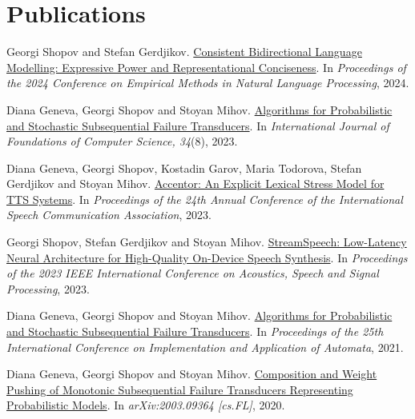 \documentclass[12pt,a4paper,sans,colorlinks]{moderncv}
\begin{document}
\section{Publications}
\begin{cvenumerate}
	\item Georgi Shopov and Stefan Gerdjikov. \newline \href{https://aclanthology.org/2024.emnlp-main.328/}{Consistent Bidirectional Language Modelling: Expressive Power and Representational Conciseness}. \newline In \emph{Proceedings of the 2024 Conference on Empirical Methods in Natural Language Processing}, 2024.
	\item Diana Geneva, Georgi Shopov and Stoyan Mihov. \newline \href{https://www.worldscientific.com/doi/10.1142/S012905412243002X}{Algorithms for Probabilistic and Stochastic Subsequential Failure Transducers}. \newline In \emph{International Journal of Foundations of Computer Science, 34}(8), 2023.
	\item Diana Geneva, Georgi Shopov, Kostadin Garov, Maria Todorova, Stefan Gerdjikov and Stoyan Mihov. \newline \href{https://www.isca-archive.org/interspeech_2023/geneva23_interspeech.html}{Accentor: An Explicit Lexical Stress Model for TTS Systems}. \newline In \emph{Proceedings of the 24th Annual Conference of the International Speech Communication Association}, 2023.
	\item Georgi Shopov, Stefan Gerdjikov and Stoyan Mihov. \newline \href{https://ieeexplore.ieee.org/document/10096566}{StreamSpeech: Low-Latency Neural Architecture for High-Quality On-Device Speech Synthesis}. \newline In \emph{Proceedings of the 2023 IEEE International Conference on Acoustics, Speech and Signal Processing}, 2023.
	\item Diana Geneva, Georgi Shopov and Stoyan Mihov. \newline \href{https://link.springer.com/chapter/10.1007/978-3-030-79121-6_11}{Algorithms for Probabilistic and Stochastic Subsequential Failure Transducers}. \newline In \emph{Proceedings of the 25th International Conference on Implementation and Application of Automata}, 2021.
	\item Diana Geneva, Georgi Shopov and Stoyan Mihov. \newline \href{https://arxiv.org/abs/2003.09364}{Composition and Weight Pushing of Monotonic Subsequential Failure Transducers Representing Probabilistic Models}. \newline In \emph{arXiv:2003.09364 [cs.FL]}, 2020.

\end{cvenumerate}
\end{document}
